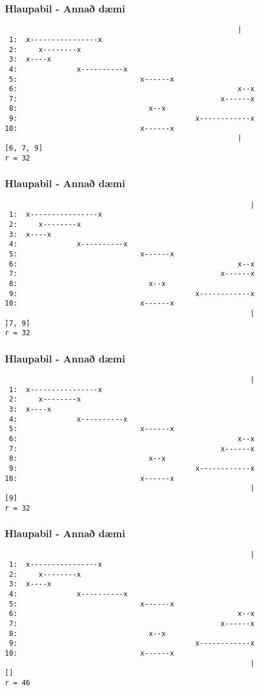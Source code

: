 \documentclass{beamer}
\begin{document}
\begin{frame}[fragile]
	\frametitle{Hlaupabil - Annað dæmi}
\begin{verbatim}
                                                       |
 1:  x----------------x
 2:     x--------x
 3:  x----x
 4:              x----------x
 5:                             x------x
 6:                                                    x--x
 7:                                                x------x
 8:                               x--x
 9:                                          x------------x
10:                             x------x
                                                       |
[6, 7, 9]
r = 32
\end{verbatim}
\end{frame}
\addtocounter{framenumber}{-1}

\begin{frame}[fragile]
	\frametitle{Hlaupabil - Annað dæmi}
\begin{verbatim}
                                                          |
 1:  x----------------x
 2:     x--------x
 3:  x----x
 4:              x----------x
 5:                             x------x
 6:                                                    x--x
 7:                                                x------x
 8:                               x--x
 9:                                          x------------x
10:                             x------x
                                                          |
[7, 9]
r = 32
\end{verbatim}
\end{frame}
\addtocounter{framenumber}{-1}

\begin{frame}[fragile]
	\frametitle{Hlaupabil - Annað dæmi}
\begin{verbatim}
                                                          |
 1:  x----------------x
 2:     x--------x
 3:  x----x
 4:              x----------x
 5:                             x------x
 6:                                                    x--x
 7:                                                x------x
 8:                               x--x
 9:                                          x------------x
10:                             x------x
                                                          |
[9]
r = 32
\end{verbatim}
\end{frame}
\addtocounter{framenumber}{-1}

\begin{frame}[fragile]
	\frametitle{Hlaupabil - Annað dæmi}
\begin{verbatim}
                                                          |
 1:  x----------------x
 2:     x--------x
 3:  x----x
 4:              x----------x
 5:                             x------x
 6:                                                    x--x
 7:                                                x------x
 8:                               x--x
 9:                                          x------------x
10:                             x------x
                                                          |
[]
r = 46
\end{verbatim}
\end{frame}
\end{document}

